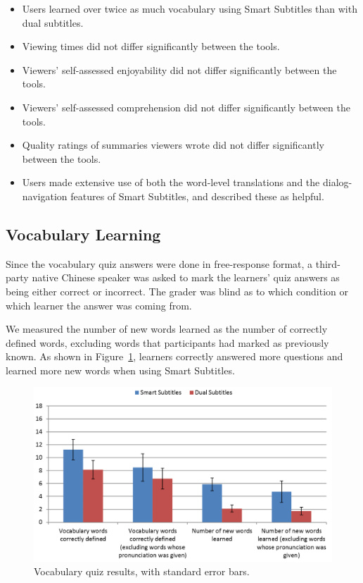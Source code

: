 \documentclass{sigchi}
\begin{document}
\begin{itemize}[noitemsep]
\item Users learned over twice as much vocabulary using Smart Subtitles than with dual subtitles.
\item Viewing times did not differ significantly between the tools.
\item Viewers' self-assessed enjoyability did not differ significantly between the tools.
\item Viewers' self-assessed comprehension did not differ significantly between the tools.
\item Quality ratings of summaries viewers wrote did not differ significantly
between the tools.
\item Users made extensive use of both the word-level translations and the dialog-navigation features of Smart Subtitles, and described these as helpful.
\end{itemize}

\subsection{Vocabulary Learning}

Since the vocabulary quiz answers were done in free-response format, a third-party native Chinese speaker was asked to mark the learners' quiz answers as being either correct or incorrect. The grader was blind as to which condition or which learner the answer was coming from.

We measured the number of new words learned as the number of correctly defined words, excluding words that participants had marked as previously known. As shown in Figure~\ref{fig:figure6}, learners correctly answered more questions and learned more new words when using Smart Subtitles.

\begin{figure}[!h]
\centering
\includegraphics[width=\columnwidth]{vocab-quiz-results}
\caption{Vocabulary quiz results, with standard error bars.}
\label{fig:figure6}
\end{figure}
\end{document}
